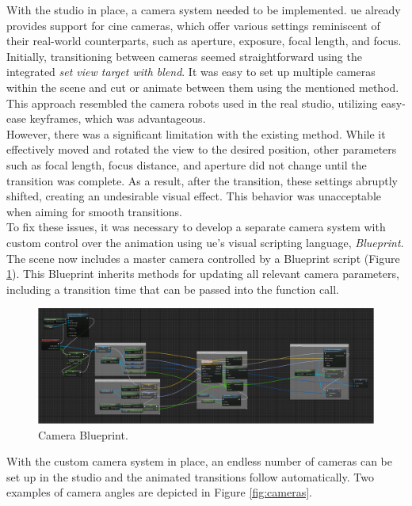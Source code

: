 \documentclass[
  a4paper,  %
  twoside,  %
  bibliography=totoc,
  headsepline,
  cleardoublepage=empty,
  parskip=half,
  draft=false
]{scrbook}
\begin{document}
With the studio in place, a camera system needed to be implemented. \gls{ue} already provides support for cine cameras, which offer various settings reminiscent of their real-world counterparts, such as aperture, exposure, focal length, and focus. Initially, transitioning between cameras seemed straightforward using the integrated \textit{set view target with blend}. It was easy to set up multiple cameras within the scene and cut or animate between them using the mentioned method. This approach resembled the camera robots used in the real studio, utilizing easy-ease keyframes, which was advantageous. \\
However, there was a significant limitation with the existing method. While it effectively moved and rotated the view to the desired position, other parameters such as focal length, focus distance, and aperture did not change until the transition was complete. As a result, after the transition, these settings abruptly shifted, creating an undesirable visual effect. This behavior was unacceptable when aiming for smooth transitions. \\
To fix these issues, it was necessary to develop a separate camera system with custom control over the animation using \gls{ue}'s visual scripting language, \textit{Blueprint}. The scene now includes a master camera controlled by a Blueprint script (Figure \ref{fig:blueprint}). This Blueprint inherits methods for updating all relevant camera parameters, including a transition time that can be passed into the function call. 
\begin{figure}[h]
  \centering
  \includegraphics[width=1\textwidth]{graphics/unreal-engine/blueprint.png}
  \caption{Camera Blueprint.}
  \label{fig:blueprint}
\end{figure}
With the custom camera system in place, an endless number of cameras can be set up in the studio and the animated transitions follow automatically. Two examples of camera angles are depicted in Figure \ref{fig:cameras}.
\end{document}
